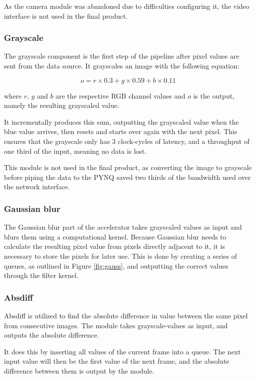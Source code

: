 As the camera module was abandoned due to difficulties configuring it, the video interface is not used in the final product.

\subsubsection{Grayscale}
The grayscale component is the first step of the pipeline after pixel values are sent from the data source. It grayscales an image with the following equation:

\begin{equation}
    o = r \times 0.3 + g \times 0.59 + b \times 0.11
\end{equation}

where $r$, $g$ and $b$ are the respective RGB channel values and $o$ is the output, namely the resulting grayscaled value.

It incrementally produces this sum, outputting the grayscaled value when the blue value arrives, then resets and starts over again with the next pixel. This ensures that the grayscale only has 3 clock-cycles of latency, and a throughput of one third of the input, meaning no data is lost.

This module is not used in the final product, as converting the image to grayscale before piping the data to the PYNQ saved two thirds of the bandwidth used over the network interface.

\subsubsection{Gaussian blur}
The Gaussian blur part of the accelerator takes grayscaled values as input and blurs them using a computational kernel. Because Gaussian blur needs to calculate the resulting pixel value from pixels directly adjacent to it, it is necessary to store the pixels for later use. This is done by creating a series of queues, as outlined in Figure \ref{fig:gauss}, and outputting the correct values through the filter kernel.

\subsubsection{Absdiff}
Absdiff is utilized to find the absolute difference in value between the same pixel from consecutive images. The module takes grayscale-values as input, and outputs the absolute difference.

It does this by inserting all values of the current frame into a queue. The next input value will then be the first value of the next frame, and the absolute difference between them is output by the module.

